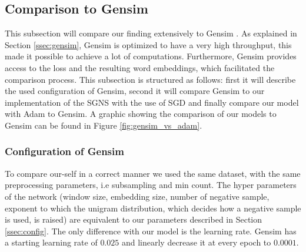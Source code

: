 \subsection{Comparison to Gensim}
This subsection will compare our finding extensively to Gensim \citep{gensim}. As explained in Section \ref{ssec:gensim}, Gensim is optimized to have a very high throughput, this made it possible to achieve a lot of computations. Furthermore, Gensim provides access to the loss and the resulting word embeddings, which facilitated the comparison process.
This subsection is structured as follows: first it will describe the used configuration of Gensim, second it will compare Gensim to our implementation of the SGNS with the use of SGD and finally compare our model with Adam to Gensim. A graphic showing the comparison of our models to Gensim can be found in Figure \ref{fig:gensim_vs_adam}.


\subsubsection{Configuration of Gensim}
To compare our-self in a correct  manner we used the same dataset, with the same preprocessing parameters, i.e subsampling and min count. The hyper parameters of the network (window size, embedding size, number of negative sample, exponent to which the unigram distribution, which decides how a negative sample is used, is raised) are equivalent to our parameters described in Section \ref{ssec:config}. The only difference with our model is the learning rate. Gensim has a starting learning rate of $0.025$ and linearly decrease it at every epoch to $0.0001$.

